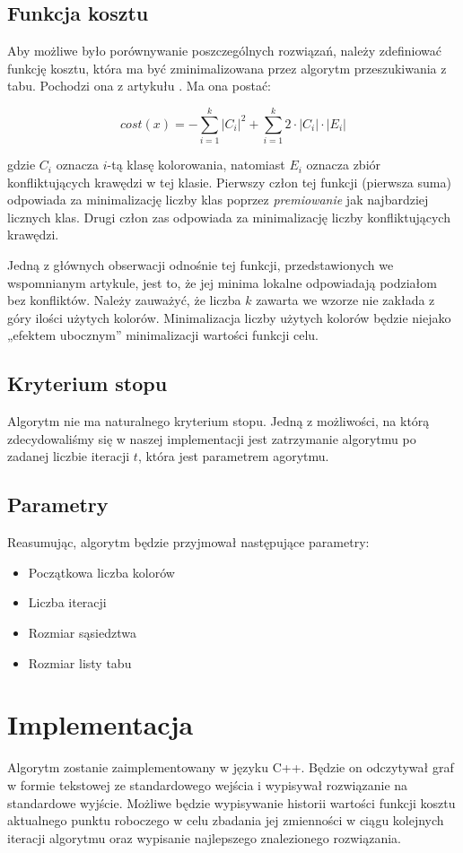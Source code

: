 \documentclass[12pt,a4paper]{article}
\begin{document}
\subsection{Funkcja kosztu}
Aby możliwe było porównywanie poszczególnych rozwiązań, należy zdefiniować funkcję kosztu, która ma być zminimalizowana przez algorytm przeszukiwania z tabu. Pochodzi ona z artykułu \cite{coloring}. Ma ona postać:

\begin{equation}
\label{cost}
cost(x) = - \sum_{i=1}^{k}|C_i|^2 + \sum_{i=1}^{k} 2\cdot|C_i|\cdot|E_i|
\end{equation}

gdzie $C_i$ oznacza $i$-tą klasę kolorowania, natomiast $E_i$ oznacza zbiór konfliktujących krawędzi w tej klasie. Pierwszy człon tej funkcji (pierwsza suma) odpowiada za minimalizację liczby klas poprzez \textit{premiowanie} jak najbardziej licznych klas. Drugi człon zas odpowiada za minimalizację liczby konfliktujących krawędzi.


Jedną z głównych obserwacji odnośnie tej funkcji, przedstawionych we wspomnianym artykule, jest to, że jej
minima lokalne odpowiadają podziałom bez konfliktów. Należy zauważyć, że liczba $k$ zawarta we
wzorze nie zakłada z góry ilości użytych kolorów. Minimalizacja liczby użytych kolorów będzie niejako
„efektem ubocznym” minimalizacji wartości funkcji celu.


\subsection{Kryterium stopu}
Algorytm nie ma naturalnego kryterium stopu. Jedną z możliwości, na którą zdecydowaliśmy się w naszej implementacji jest zatrzymanie algorytmu po zadanej liczbie iteracji $t$, która jest parametrem agorytmu.

\subsection{Parametry}
Reasumując, algorytm będzie przyjmował następujące parametry:
\begin{itemize}
\item Początkowa liczba kolorów
\item Liczba iteracji
\item Rozmiar sąsiedztwa
\item Rozmiar listy tabu
\end{itemize}


\section{Implementacja}
Algorytm zostanie zaimplementowany w języku C++. Będzie on odczytywał graf w formie tekstowej ze standardowego wejścia i wypisywał rozwiązanie na standardowe wyjście. Możliwe będzie wypisywanie historii wartości funkcji kosztu aktualnego punktu roboczego w celu zbadania jej zmienności w ciągu kolejnych iteracji algorytmu oraz wypisanie najlepszego znalezionego rozwiązania.
\end{document}
